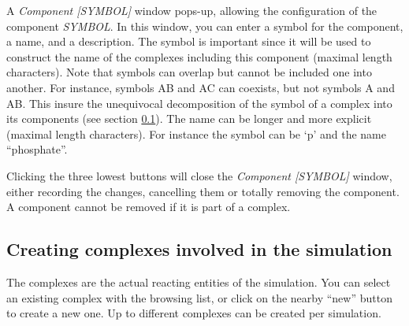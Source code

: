 A \emph{Component
  [SYMBOL]} window pops-up, allowing the configuration of the component
\emph{SYMBOL}.  In this window, you can enter a symbol for the component, a
name, and a description. The symbol is important since it will be used to
construct the name of the complexes including this component (maximal length
\MAXCOMPONENTSYMBOLLENGTH{} characters). Note that symbols can overlap but
cannot be included one into another. For instance, symbols AB and AC can
coexists, but not symbols A and AB. This insure the unequivocal decomposition of
the symbol of a complex into its components (see section \ref{make_complexes}).
The name can be longer and more explicit (maximal length
\MAXCOMPONENTNAMELENGTH{} characters). For instance the symbol can be `p' and
the name ``phosphate''.

Clicking the three lowest buttons will close the \emph{Component [SYMBOL]}
window, either recording the changes, cancelling them or totally removing the
component. A component cannot be removed if it is part of a complex.

\subsection{Creating complexes involved in the simulation}\label{make_complexes}

The complexes are the actual reacting entities of the simulation. You can select
an existing complex with the browsing list, or click on the nearby ``new''
button to create a new one. Up to \MAXCOMPLEXTYPES{} different complexes can be
created per simulation.

